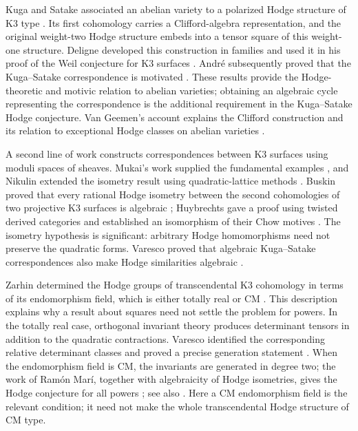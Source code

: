 \documentclass[11pt]{article}
\numberwithin{equation}{section}
\theoremstyle{definition}
\theoremstyle{remark}
\begin{document}
Kuga and Satake associated an abelian variety to a polarized Hodge structure
of K3 type \cite{KugaSatake}.  Its first cohomology carries a Clifford-algebra
representation, and the original weight-two Hodge structure embeds into a
tensor square of this weight-one structure.  Deligne developed this
construction in families and used it in his proof of the Weil conjecture
for K3 surfaces \cite[Sections~5--6]{DeligneK3}.  Andr\'e subsequently proved
that the Kuga--Satake correspondence is motivated
\cite[Section~7.1]{AndreMotives}.  These results provide the Hodge-theoretic
and motivic relation to abelian varieties; obtaining an algebraic cycle
representing the correspondence is the additional requirement in the
Kuga--Satake Hodge conjecture.  Van Geemen's account explains the Clifford
construction and its relation to exceptional Hodge classes on abelian
varieties \cite{VanGeemenKS}.

A second line of work constructs correspondences between K3 surfaces using
moduli spaces of sheaves.  Mukai's work supplied the fundamental examples
\cite{MukaiBundles}, and Nikulin extended the isometry result using
quadratic-lattice methods \cite{NikulinCorrespondences}.  Buskin proved that every rational Hodge isometry between
the second cohomologies of two projective K3 surfaces is algebraic
\cite[Theorem~1.1]{Buskin}; Huybrechts gave a proof using twisted derived
categories and established an isomorphism of their Chow motives
\cite[Theorems~0.1--0.2]{HuybrechtsIsogenous}.  The isometry hypothesis is
significant: arbitrary Hodge homomorphisms need not preserve the quadratic
forms.  Varesco proved that algebraic Kuga--Satake correspondences also make
Hodge similarities algebraic \cite[Theorem~4.5]{VarescoSimilarities}.

Zarhin determined the Hodge groups of transcendental K3 cohomology in terms
of its endomorphism field, which is either totally real or CM \cite{Zarhin}.
This description explains why a result about squares need not settle the
problem for powers.  In the totally real case, orthogonal invariant theory
produces determinant tensors in addition to the quadratic contractions.
Varesco identified the corresponding relative determinant classes and
proved a precise generation statement
\cite[Theorem~2.16]{VarescoPowers}.  When the endomorphism field is CM, the
invariants are generated in degree two; the work of Ram\'on Mar\'i, together
with algebraicity of Hodge isometries, gives the Hodge conjecture for all
powers \cite{RamonMari,Buskin}; see also
\cite[Theorem~2.2 and Corollary~2.3]{VarescoPowers}.  Here a CM endomorphism
field is the relevant condition; it need not make the whole transcendental
Hodge structure of CM type.
\end{document}
